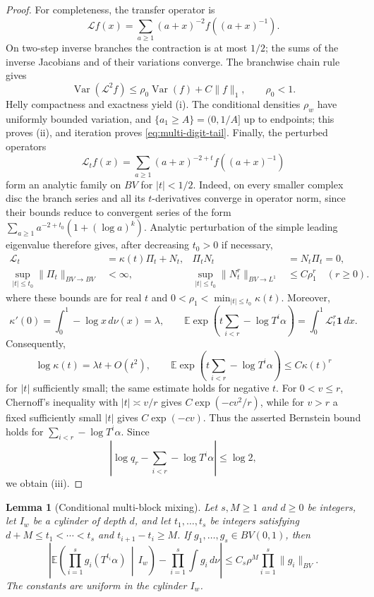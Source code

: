 \documentclass[11pt,a4paper]{amsart}
\newtheorem{lemma}[theorem]{Lemma}
\theoremstyle{definition}
\theoremstyle{remark}
\newcommand{\E}{\mathbb E}
\newcommand{\ind}{\mathbf 1}
\newcommand{\Var}{\operatorname{Var}}
\begin{document}
\begin{proof}
For completeness, the transfer operator is
\[
 \mathcal Lf(x)=\sum_{a\ge1}(a+x)^{-2}
 f\!\left((a+x)^{-1}\right).
\]
On two-step inverse branches the contraction is at most $1/2$; the sums of
the inverse Jacobians and of their variations converge.  The branchwise chain
rule gives
\[
 \Var(\mathcal L^2f)\le\rho_0\Var(f)+C\|f\|_1,
 \qquad \rho_0<1.
\]
Helly compactness and exactness yield (i).  The conditional densities
$\rho_w$ have uniformly bounded variation, and
$\{a_1\ge A\}=(0,1/A]$ up to endpoints; this proves (ii), and iteration proves
\eqref{eq:multi-digit-tail}.  Finally, the perturbed operators
\[
 \mathcal L_t f(x)=\sum_{a\ge1}(a+x)^{-2+t}
 f\!\left((a+x)^{-1}\right)
\]
form an analytic family on $BV$ for $|t|<1/2$.  Indeed, on every smaller
complex disc the branch series and all its $t$-derivatives converge in
operator norm, since their bounds reduce to convergent series of the form
$\sum_{a\ge1}a^{-2+t_0}(1+(\log a)^k)$.  Analytic perturbation of the simple
leading eigenvalue \cite[Chap.~VII]{Kato95} therefore gives, after decreasing
$t_0>0$ if necessary,
\[
 \begin{aligned}
  \mathcal L_t&=\kappa(t)\Pi_t+N_t,
  &\Pi_tN_t&=N_t\Pi_t=0,\\
  \sup_{|t|\le t_0}\|\Pi_t\|_{BV\to BV}&<\infty,
  &\sup_{|t|\le t_0}\|N_t^r\|_{BV\to L^1}&\le C\rho_1^r
  \quad(r\ge0).
 \end{aligned}
\]
where these bounds are for real $t$ and
$0<\rho_1<\min_{|t|\le t_0}\kappa(t)$.  Moreover,
\[
 \kappa'(0)=\int_0^1-\log x\,d\nu(x)=\lambda,
 \qquad
 \E\exp\!\left(t\sum_{i<r}-\log T^i\alpha\right)
 =\int_0^1\mathcal L_t^r\ind\,dx.
\]
Consequently,
\[
 \log\kappa(t)=\lambda t+O(t^2),
 \qquad
 \E\exp\!\left(t\sum_{i<r}-\log T^i\alpha\right)
 \le C\kappa(t)^r
\]
for $|t|$ sufficiently small; the same estimate holds for negative $t$.
For $0<v\le r$, Chernoff's inequality with $|t|\asymp v/r$ gives
$C\exp(-cv^2/r)$, while for $v>r$ a fixed sufficiently small $|t|$ gives
$C\exp(-cv)$.  Thus the asserted Bernstein bound holds for
$\sum_{i<r}-\log T^i\alpha$.
Since
\[
 \left|\log q_r-\sum_{i<r}-\log T^i\alpha\right|\le\log2,
\]
we obtain (iii).
\end{proof}

\begin{lemma}[Conditional multi-block mixing]\label{lem:conditional-mixing}
Let $s,M\ge1$ and $d\ge0$ be integers, let $I_w$ be a cylinder of depth $d$,
and let $t_1,\ldots,t_s$ be integers satisfying
$d+M\le t_1<\cdots<t_s$ and $t_{i+1}-t_i\ge M$.  If
$g_1,\ldots,g_s\in BV(0,1)$, then
\begin{equation}\label{eq:conditional-mixing}
 \left|
 \E\left(\prod_{i=1}^s g_i(T^{t_i}\alpha)\,\middle|\,I_w\right)
 -\prod_{i=1}^s\int g_i\,d\nu
 \right|
 \le C_s\rho^M\prod_{i=1}^s\|g_i\|_{BV}.
\end{equation}
The constants are uniform in the cylinder $I_w$.
\end{lemma}
\end{document}
